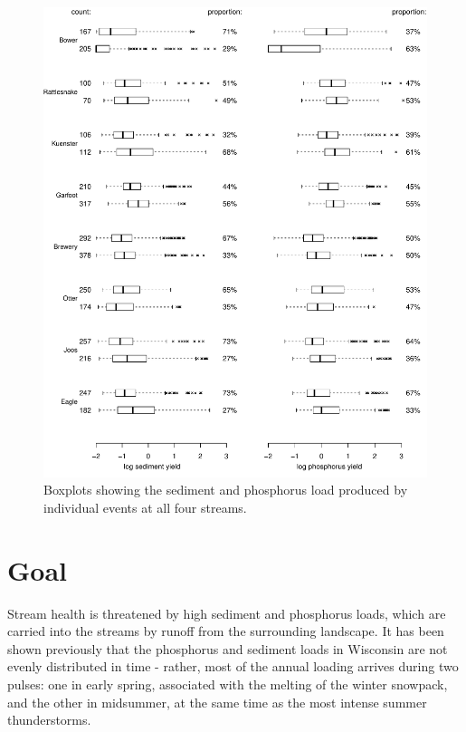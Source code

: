 \documentclass[10pt]{article}
\begin{document}
\begin{figure}[h]
    \begin{center}
\includegraphics{loadings-show_boxplots}
    \caption{Boxplots showing the sediment and phosphorus load produced by individual events at all four streams.\label{boxplots}}
    \end{center}
\end{figure}










    
    



\section{Goal}
Stream health is threatened by high sediment and phosphorus loads, which are carried into the streams by runoff from the surrounding landscape. It has been shown previously\cite{Danz:2010} that the phosphorus and sediment loads in Wisconsin are not evenly distributed in time - rather, most of the annual loading arrives during two pulses: one in early spring, associated with the melting of the winter snowpack, and the other in midsummer, at the same time as the most intense summer thunderstorms.\\
\end{document}
